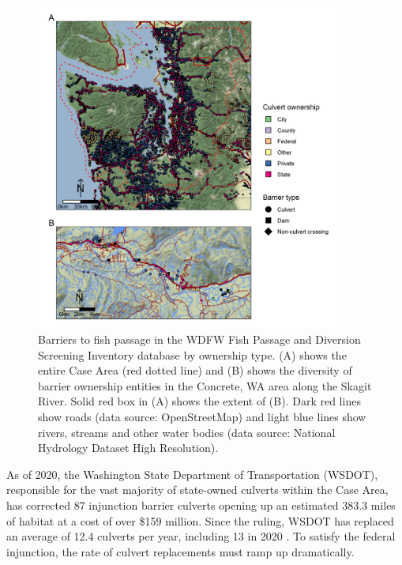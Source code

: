\documentclass[12pt]{elsarticle}
\begin{document}
\begin{figure}
\includegraphics[width=10cm]{figures/fig_mapconcrete.png}
\caption{Barriers to fish passage in the WDFW Fish Passage and Diversion Screening Inventory database by ownership type. (A) shows the entire Case Area (red dotted line) and (B) shows the diversity of barrier ownership entities in the Concrete, WA area along the Skagit River. Solid red box in (A) shows the extent of (B). Dark red lines show roads (data source: OpenStreetMap) and light blue lines show rivers, streams and other water bodies (data source: National Hydrology Dataset High Resolution).\label{fig:barrierMap}}
\end{figure}%

As of 2020, the Washington State Department of Transportation (WSDOT), responsible for the vast majority of state-owned culverts within the Case Area, has corrected 87 injunction barrier culverts opening up an estimated 383.3 miles of habitat at a cost of over \$159 million. Since the ruling, WSDOT has replaced an average of 12.4 culverts per year, including 13 in 2020 \citep{noauthor_wsdot_2020}. To satisfy the federal injunction, the rate of culvert replacements must ramp up dramatically. 
\end{document}
